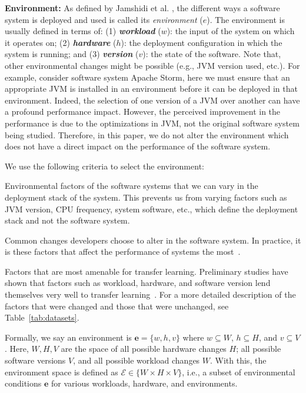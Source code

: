 \documentclass[10pt,journal,compsoc]{IEEEtran}
\begin{document}
\noindent\textbf{Environment: }
As defined by Jamshidi et al. \cite{jamshidi2017transfer2}, 
the different ways
a software system
is deployed and used is called its
  {\em environment} ($e$). 
The environment is usually defined in terms of: (1) \textbf{\textit{workload}} ($w$): the input of the system 
on which it operates on; (2) \textbf{\textit{hardware}} ($h$): the deployment configuration in 
which the system is running; and (3) \textbf{\textit{version}} ($v$): the state of the 
software. 
Note that, other environmental changes might be possible (e.g., JVM version used, etc.). For example, consider software system Apache Storm, here
we must ensure that an appropriate JVM is installed in an environment before it can be deployed in that environment. Indeed, the selection of one version of 
a JVM over another can have a profound performance impact. However, the perceived improvement in the performance is due to the optimizations in JVM, not the original software system being studied.  Therefore, in this paper, we do not alter the environment which does not have a direct impact on the performance of the software system. 

\noindent We use the following criteria to select the  environment:
\be[leftmargin=*]
    \item Environmental factors of the software systems that we can vary in the deployment stack of the system. This prevents us from varying factors such as JVM version, CPU frequency, system software, etc., which define the deployment stack and not the software system. 
    \item Common changes developers choose to alter in the software system. In practice, it is these factors that affect the performance of systems the most~\cite{jamshidi2017transfer2, jamshidi2017transfer, valov2017transferring, valov2015}. 
    \item Factors that are most amenable for transfer learning. Preliminary studies have shown that factors such as workload, hardware, and software version lend themselves very well to transfer learning~\cite{jamshidi2017transfer2, jamshidi2017transfer}.
\ee
For a more detailed description of the factors that were changed and those that were unchanged, see Table~\ref{tab:datasets}.

Formally, we say an environment is   $\mathit{\mathbf{e}}=\{w, h, v\}$ where $w \subseteq W$, $h \subseteq H$, and $v \subseteq V$. Here, $W, H, V$ are the space of all possible hardware changes $H$;   all possible software versions $V$, and all possible workload changes  $W$. With this, the environment space is defined as $\mathcal{E}\in\{W\times H\times V\}$, i.e., a subset of environmental conditions $\mathit{\mathbf{e}}$ for various workloads, hardware, and environments.
\end{document}
